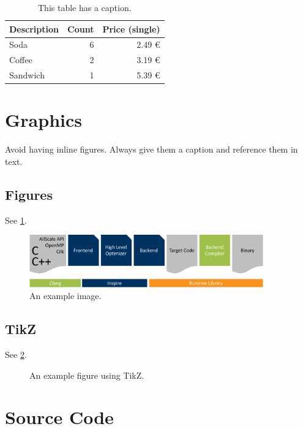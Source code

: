 \begin{table}
	\centering
	\begin{tabularx}{0.75\textwidth}{Xrr}
		\toprule
		Description & Count & Price (single)\\
		\midrule
		Soda & 6 & 2.49 €\\
		Coffee & 2 & 3.19 €\\
		Sandwich & 1 & 5.39 €\\
		\bottomrule
	\end{tabularx}
	\caption{This table has a caption.}
	\label{tbl:some_table}
\end{table}

\section{Graphics}

Avoid having inline figures.
Always give them a caption and reference them in text.

\subsection{Figures}

See \cref{fig:some_figure}.

\begin{figure}
	\centering
	\includegraphics[width=0.9\textwidth]{images/example.pdf}
	\caption{An example image.}
	\label{fig:some_figure}
\end{figure}

\subsection{TikZ}

See \cref{fig:tikz_figure}.

\begin{figure}
	\centering
	
	\caption{An example figure using TikZ.}
	\label{fig:tikz_figure}
\end{figure}

\section{Source Code}

